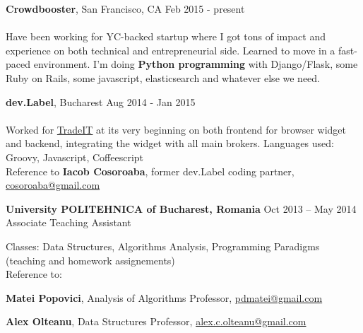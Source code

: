 \documentclass[margin,line]{resume}
\begin{document}
\begin{resume}
    \vspace{1.2mm}\textbf{Crowdbooster}, San Francisco, CA
        \hfill Feb 2015 - present\vspace{1mm}\\
    \selectfont{Software Developer}\vspace{1.2mm}\\
    {\fontsize{2.65mm}{1em}\selectfont
    Have been working for YC-backed startup where I got tons of impact and experience on both technical and entrepreneurial side. Learned to move in a fast-paced environment. I'm doing \textbf{Python programming} with Django/Flask, some Ruby on Rails, some javascript, elasticsearch and whatever else we need.
    }

    \vspace{1.2mm}\textbf{dev.Label}, Bucharest
        \hfill Aug 2014 - Jan 2015\vspace{1mm}\\
    \selectfont{Frontend \& Backend Developer}\vspace{1.2mm}\\
    {\fontsize{2.65mm}{1em}\selectfont
      Worked for \href{https://www.trade.it/}{TradeIT} at its very beginning on both frontend for browser widget and backend, integrating the widget with all main brokers.
      Languages used: Groovy, Javascript, Coffeescript\\
      Reference to \textbf{Iacob Cosoroaba}, former dev.Label coding partner, \href{mailto:cosoroaba@gmail.com}{cosoroaba@gmail.com}
     }

    \vspace{1.2mm}\textbf{University POLITEHNICA of Bucharest, Romania}
        \hfill Oct 2013 -- May 2014\vspace{1mm}\\
        Associate Teaching Assistant\vspace{1.2mm}\\
    {\fontsize{2.65mm}{1em}\selectfont
      Classes: Data Structures, Algorithms Analysis, Programming Paradigms (teaching and homework assignements)\\
      Reference to:
      \begin{list2}
          \item \textbf{Matei Popovici}, Analysis of Algorithms Professor, \href{mailto:pdmatei@gmail.com}{pdmatei@gmail.com}
          \item \textbf{Alex Olteanu}, Data Structures Professor, \href{mailto:alex.c.olteanu@gmail.com}{alex.c.olteanu@gmail.com}
      \end{list2}
    }


\end{resume}
\end{document}
